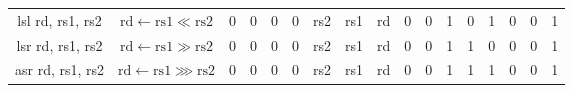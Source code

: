 \documentclass[a4paper,10pt]{article}
\begin{document}
\begin{landscape}
\begin{longtable}[c]{|c|c|@{}c@{}|@{}c@{}|@{}c@{}|@{}c@{}|@{}c@{}|@{}c@{}|@{}c@{}|@{}c@{}|@{}c@{}|@{}c@{}|@{}c@{}|@{}c@{}|@{}c@{}|@{}c@{}|@{}c@{}|@{}c@{}|@{}c@{}|@{}c@{}|@{}c@{}|@{}c@{}|@{}c@{}|@{}c@{}|@{}c@{}|@{}c@{}|}
lsl rd, rs1, rs2      & $\mathrm{rd} \leftarrow \mathrm{rs1} \ll \mathrm{rs2}$ & 0 & 0 & 0 & 0 & \multicolumn{4}{c|}{rs2}            & \multicolumn{4}{c|}{rs1}            & \multicolumn{4}{c|}{rd}      & 0              & 0                & 1   & 0   & 1   & 0 & 0 & 1 \\
lsr rd, rs1, rs2      & $\mathrm{rd} \leftarrow \mathrm{rs1} \gg \mathrm{rs2}$ & 0 & 0 & 0 & 0 & \multicolumn{4}{c|}{rs2}            & \multicolumn{4}{c|}{rs1}            & \multicolumn{4}{c|}{rd}      & 0              & 0                & 1   & 1   & 0   & 0 & 0 & 1 \\
asr rd, rs1, rs2      & $\mathrm{rd} \leftarrow \mathrm{rs1} \ggg \mathrm{rs2}$ & 0 & 0 & 0 & 0 & \multicolumn{4}{c|}{rs2}            & \multicolumn{4}{c|}{rs1}            & \multicolumn{4}{c|}{rd}      & 0              & 0                & 1   & 1   & 1   & 0 & 0 & 1 \\


\end{longtable}
\end{landscape}
\end{document}
